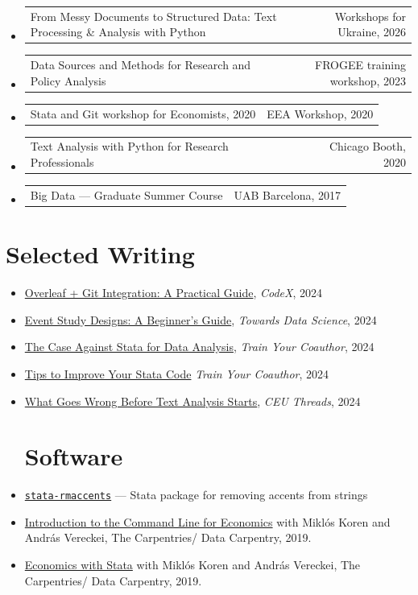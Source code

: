 \documentclass[10pt, a4paper]{article}
\makeatletter
\newcommand{\sans}{\fontfamily{phv}\selectfont}
\newcommand{\cvyear}[1]{%
  {\sans\fontsize{7.5}{9}\selectfont\color{inkfaint}#1}%
}
\newcommand{\cventry}[2]{%
  \noindent
  \begin{tabularx}{\textwidth}{@{}X@{\hspace{1em}}r@{}}
    #1 & \cvyear{#2}
  \end{tabularx}\vspace{1pt}%
}
\makeatother
\begin{document}
\begin{itemize}
\item \cventry{From Messy Documents to Structured Data: Text Processing \& Analysis with Python}{Workshops for Ukraine, 2026}
\item \cventry{ Data Sources and Methods for Research and Policy
Analysis}{FROGEE training workshop, 2023}
\item \cventry{Stata and Git workshop for Economists, 2020}{EEA Workshop, 2020}
\item \cventry{Text Analysis with Python for Research Professionals}{Chicago Booth, 2020}
\item \cventry{Big Data — Graduate Summer Course}{UAB Barcelona, 2017}
\end{itemize}


\section{Selected Writing }

\begin{itemize}
\item \href{https://medium.com/codex}{Overleaf + Git Integration: A Practical Guide}, \textit{CodeX}, 2024
\item \href{https://towardsdatascience.com}{Event Study Designs: A Beginner's Guide}, \textit{Towards Data Science}, 2024
\item \href{https://medium.com/train-your-coauthor/the-case-against-stata-5954ace8ab79}{ The Case Against Stata for Data Analysis}, \textit{Train Your Coauthor}, 2024
\item  \href{https://medium.com/train-your-coauthor/how-to-improve-your-stata-code-671ca190e3bf }{Tips to Improve Your Stata Code} \textit{Train Your Coauthor}, 2024
\item \href{https://medium.com/ceu-economic-threads/coding-what-not-to-do-best-practices-for-data-scraping-and-conversion-e7a07a7bddf8 }{What Goes Wrong Before Text Analysis Starts}, \textit{CEU Threads}, 2024

\section{Software}

\item \href{https://github.com/ariedamuco/stata-rmaccents}{\texttt{stata-rmaccents}} — Stata package for removing accents from strings
\item \href{https://datacarpentry.org/shell-economics/}{Introduction to the Command Line for Economics} with Mikl\'os Koren and Andr\'as Vereckei, The Carpentries/ Data Carpentry, 2019. 

\item \href{https://datacarpentry.org/stata-economics/}{Economics with Stata} with Mikl\'os Koren and Andr\'as Vereckei, The Carpentries/ Data Carpentry, 2019. 
\end{itemize}
\end{document}
